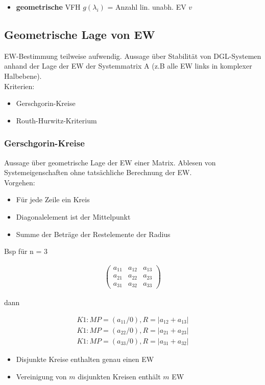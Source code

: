 \documentclass[10pt,a4paper]{article}
\begin{document}
  \begin{itemize}
    \item \textbf{geometrische} VFH $g(\lambda_i)$ = Anzahl lin. unabh. EV $v$
  \end{itemize}

  \subsection{Geometrische Lage von EW}
  EW-Bestimmung teilweise aufwendig. Aussage über Stabilität von DGL-Systemen anhand der Lage der EW der Systemmatrix A 
  (z.B alle EW links in komplexer Halbebene).\\
  Kriterien:
  \begin{itemize}
    \item Gerschgorin-Kreise 
    \item Routh-Hurwitz-Kriterium
  \end{itemize}

  \subsubsection{Gerschgorin-Kreise}
Aussage über geometrische Lage der EW einer Matrix.
Ablesen von Systemeigenschaften ohne tatsächliche Berechnung der EW.\\
Vorgehen:
  \begin{itemize}
    \item Für jede Zeile ein Kreis
    \item Diagonalelement ist der Mittelpunkt
    \item Summe der Beträge der Restelemente der Radius
  \end{itemize}
Bsp für n = 3
  \begin{mdframed}[style=exercise]
    \begin{align}
        \begin{pmatrix}
             a_{11} & a_{12} & a_{13} \\
             a_{21} & a_{22} & a_{23} \\
             a_{31} & a_{32} & a_{33} 
        \end{pmatrix}
    \end{align}
  \end{mdframed}
  dann
  \begin{mdframed}[style=exercise]
    \begin{align}
        K1: MP=(a_{11}/0), R=|a_{12}+a_{13}|\\
        K1: MP=(a_{22}/0), R=|a_{21}+a_{23}|\\
        K1: MP=(a_{33}/0), R=|a_{31}+a_{32}|
    \end{align}
  \end{mdframed}
  \begin{itemize}
    \item Disjunkte Kreise enthalten genau einen EW
    \item Vereinigung von $m$ disjunkten Kreisen enthält $m$ EW
  \end{itemize}
\end{document}
